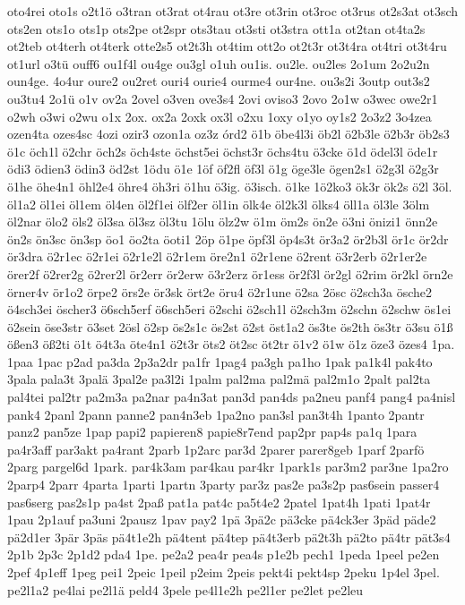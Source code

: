 {oto4rei
oto1s
o2t1ö
o3tran
ot3rat
ot4rau
ot3re
ot3rin
ot3roc
ot3rus
ot2s3at
ot3sch
ots2en
ots1o
ots1p
ots2pe
ot2spr
ots3tau
ot3sti
ot3stra
ott1a
ot2tan
ot4ta2s
ot2teb
ot4terh
ot4terk
otte2s5
ot2t3h
ot4tim
ott2o
ot2t3r
ot3t4ra
ot4tri
ot3t4ru
ot1url
o3tü
ouff6
ou1f4l
ou4ge
ou3gl
o1uh
ou1is.
ou2le.
ou2les
2o1um
2o2u2n
oun4ge.
4o4ur
oure2
ou2ret
ouri4
ourie4
ourme4
our4ne.
ou3s2i
3outp
out3s2
ou3tu4
2o1ü
o1v
ov2a
2ovel
o3ven
ove3s4
2ovi
oviso3
2ovo
2o1w
o3wec
owe2r1
o2wh
o3wi
o2wu
o1x
2ox.
ox2a
2oxk
ox3l
o2xu
1oxy
o1yo
oy1s2
2o3z2
3o4zea
ozen4ta
ozes4sc
4ozi
ozir3
ozon1a
oz3z
órd2
ö1b
öbe4l3i
öb2l
ö2b3le
ö2b3r
öb2s3
ö1c
öch1l
ö2chr
öch2s
öch4ste
öchst5ei
öchst3r
öchs4tu
ö3cke
ö1d
ödel3l
öde1r
ödi3
ödien3
ödin3
öd2st
1ödu
ö1e
1öf
öf2fl
öf3l
ö1g
öge3le
ögen2s1
ö2g3l
ö2g3r
ö1he
öhe4n1
öhl2e4
öhre4
öh3ri
ö1hu
ö3ig.
ö3isch.
ö1ke
1ö2ko3
ök3r
ök2s
ö2l
3öl.
öl1a2
öl1ei
öl1em
öl4en
öl2f1ei
ölf2er
öl1in
ölk4e
öl2k3l
ölks4
öll1a
öl3le
3ölm
öl2nar
ölo2
öls2
öl3sa
öl3sz
öl3tu
1ölu
ölz2w
ö1m
öm2s
ön2e
ö3ni
önizi1
önn2e
ön2s
ön3sc
ön3sp
öo1
öo2ta
öoti1
2öp
ö1pe
öpf3l
öp4s3t
ör3a2
ör2b3l
ör1c
ör2dr
ör3dra
ö2r1ec
ö2r1ei
ö2r1e2l
ö2r1em
öre2n1
ö2r1ene
ö2rent
ö3r2erb
ö2r1er2e
örer2f
ö2rer2g
ö2rer2l
ör2err
ör2erw
ö3r2erz
ör1ess
ör2f3l
ör2gl
ö2rim
ör2kl
örn2e
örner4v
ör1o2
örpe2
örs2e
ör3sk
ört2e
öru4
ö2r1une
ö2sa
2ösc
ö2sch3a
ösche2
ö4sch3ei
öscher3
ö6sch5erf
ö6sch5eri
ö2schi
ö2sch1l
ö2sch3m
ö2schn
ö2schw
ös1ei
ö2sein
öse3str
ö3set
2ösl
ö2sp
ös2s1c
ös2st
ö2st
öst1a2
ös3te
ös2th
ös3tr
ö3su
ö1ß
ößen3
öß2ti
ö1t
ö4t3a
öte4n1
ö2t3r
öts2
öt2sc
öt2tr
ö1v2
ö1w
ö1z
öze3
özes4
1pa.
1paa
1pac
p2ad
pa3da
2p3a2dr
pa1fr
1pag4
pa3gh
pa1ho
1pak
pa1k4l
pak4to
3pala
pala3t
3palä
3pal2e
pa3l2i
1palm
pal2ma
pal2mä
pal2m1o
2palt
pal2ta
pal4tei
pal2tr
pa2m3a
pa2nar
pa4n3at
pan3d
pan4ds
pa2neu
panf4
pang4
pa4nisl
pank4
2panl
2pann
panne2
pan4n3eb
1pa2no
pan3sl
pan3t4h
1panto
2pantr
panz2
pan5ze
1pap
papi2
papieren8
papie8r7end
pap2pr
pap4s
pa1q
1para
pa4r3aff
par3akt
pa4rant
2parb
1p2arc
par3d
2parer
parer8geb
1parf
2parfö
2parg
pargel6d
1park.
par4k3am
par4kau
par4kr
1park1s
par3m2
par3ne
1pa2ro
2parp4
2parr
4parta
1parti
1partn
3party
par3z
pas2e
pa3s2p
pas6sein
passer4
pas6serg
pas2s1p
pa4st
2paß
pat1a
pat4c
pa5t4e2
2patel
1pat4h
1pati
1pat4r
1pau
2p1auf
pa3uni
2pausz
1pav
pay2
1pä
3pä2c
pä3cke
pä4ck3er
3päd
päde2
pä2d1er
3pär
3päs
pä4t1e2h
pä4tent
pä4tep
pä4t3erb
pä2t3h
pä2to
pä4tr
pät3s4
2p1b
2p3c
2p1d2
pda4
1pe.
pe2a2
pea4r
pea4s
p1e2b
pech1
1peda
1peel
pe2en
2pef
4p1eff
1peg
pei1
2peic
1peil
p2eim
2peis
pekt4i
pekt4sp
2peku
1p4el
3pel.
pe2l1a2
pe4lai
pe2l1ä
peld4
3pele
pe4l1e2h
pe2l1er
pe2let
pe2leu
}
